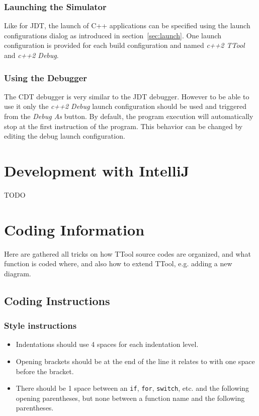 \documentclass[12pt]{article}
\begin{document}
\subsubsection{Launching the Simulator}

Like for JDT, the launch of C++ applications can be specified using the launch
configurations dialog as introduced in section~\ref{sec:launch}. One launch
configuration is provided for each build configuration and named
\textit{c++2 TTool} and \textit{c++2 Debug}.

\subsubsection{Using the Debugger}

The CDT debugger is very similar to the JDT debugger. However to be able to use
it only the \textit{c++2 Debug} launch configuration should be used and
triggered from the \textit{Debug As} button. By default, the program execution
will automatically stop at the first instruction of the program. This behavior
can be changed by editing the debug launch configuration.

\section{Development with IntelliJ}

TODO

\section{Coding Information}
Here are gathered all tricks on how TTool source codes are organized, and what function is coded where, and also how to extend TTool, e.g. adding a new diagram.

\subsection{Coding Instructions}

\subsubsection{Style instructions}

\begin{itemize}
\item Indentations should use 4 spaces for each indentation level.
\item Opening brackets should be at the end of the line it relates to with one
    space before the bracket.
\item There should be 1 space between an \texttt{if}, \texttt{for},
    \texttt{switch}, etc. and the following opening parentheses, but none
        between a function name and the following parentheses.
\end{itemize}
\end{document}
